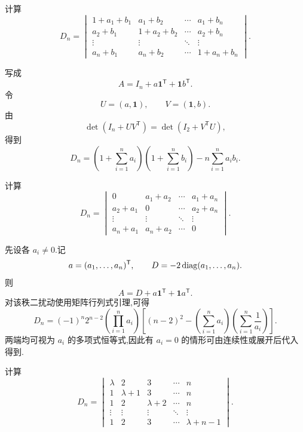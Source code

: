 \begin{example}
计算
\[
D_n=
\begin{vmatrix}
1+a_1+b_1&a_1+b_2&\cdots&a_1+b_n\\
a_2+b_1&1+a_2+b_2&\cdots&a_2+b_n\\
\vdots&\vdots&\ddots&\vdots\\
a_n+b_1&a_n+b_2&\cdots&1+a_n+b_n
\end{vmatrix}.
\]
\end{example}
\exampleblank

\begin{solution}
写成
\[
A=I_n+a\boldsymbol{1}^{\mathsf T}+\boldsymbol{1}b^{\mathsf T}.
\]
令
\[
U=(a,\boldsymbol{1}),
\qquad
V=(\boldsymbol{1},b).
\]
由
\[
\det(I_n+UV^{\mathsf T})
=
\det(I_2+V^{\mathsf T}U),
\]
得到
\[
\boxed{
D_n
=
\left(1+\sum\limits_{i=1}^{n}a_i\right)
\left(1+\sum\limits_{i=1}^{n}b_i\right)
-
n\sum\limits_{i=1}^{n}a_ib_i
}.
\]
\end{solution}


\begin{example}
计算
\[
D_n=
\begin{vmatrix}
0&a_1+a_2&\cdots&a_1+a_n\\
a_2+a_1&0&\cdots&a_2+a_n\\
\vdots&\vdots&\ddots&\vdots\\
a_n+a_1&a_n+a_2&\cdots&0
\end{vmatrix}.
\]
\end{example}
\exampleblank

\begin{solution}
先设各 $a_i\neq0$.记
\[
a=(a_1,\ldots,a_n)^{\mathsf T},
\qquad
D=-2\operatorname{diag}(a_1,\ldots,a_n).
\]
则
\[
A=D+a\boldsymbol{1}^{\mathsf T}+\boldsymbol{1}a^{\mathsf T}.
\]
对该秩二扰动使用矩阵行列式引理,可得
\[
\boxed{
D_n
=
(-1)^n2^{n-2}
\left(\prod\limits_{i=1}^{n}a_i\right)
\left[
(n-2)^2
-
\left(\sum\limits_{i=1}^{n}a_i\right)
\left(\sum\limits_{i=1}^{n}\dfrac{1}{a_i}\right)
\right]
}.
\]
两端均可视为 $a_i$ 的多项式恒等式,因此有 $a_i=0$ 的情形可由连续性或展开后代入得到.
\end{solution}


\begin{example}
计算
\[
D_n=
\begin{vmatrix}
\lambda&2&3&\cdots&n\\
1&\lambda+1&3&\cdots&n\\
1&2&\lambda+2&\cdots&n\\
\vdots&\vdots&\vdots&\ddots&\vdots\\
1&2&3&\cdots&\lambda+n-1
\end{vmatrix}.
\]
\end{example}
\exampleblank

